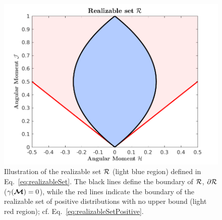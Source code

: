 \begin{figure}[h]
  \centering
  \includegraphics[width=1.0\linewidth]{figures/RealizableSetFermionic}
  \caption{Illustration of the realizable set $\mathcal{R}$ (light blue region) defined in Eq.~\eqref{eq:realizableSet}.  
  The black lines define the boundary of $\mathcal{R}$, $\partial\mathcal{R}$ ($\gamma(\boldsymbol{\mathcal{M}}) = 0$), while the red lines indicate the boundary of the realizable set of positive distributions with no upper bound (light red region); cf. Eq.~\eqref{eq:realizableSetPositive}.}
  \label{fig:RealizableSetFermionic}
\end{figure}

